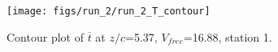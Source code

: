 \begin{figure}[H]
\centering
\texttt{[image: figs/run\_2/run\_2\_T\_contour]}
\caption{Contour plot of $\overline{t}$ at $z/c$=5.37, $V_{free}$=16.88, station 1.}
\label{fig:run_2_T_contour}
\end{figure}


